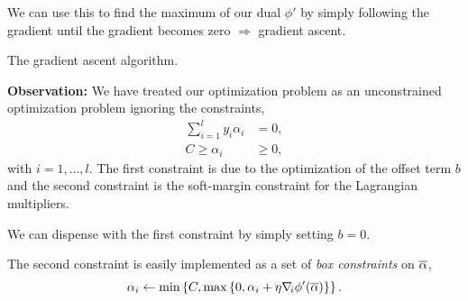 \documentclass[a4paper,blends,pdf,colorBG,slideColor]{prosper}
\begin{document}
We can use this to find the maximum of our dual $\phi'$ by simply following the gradient until the 
gradient becomes zero $\Rightarrow$ gradient ascent.
\es

\vspace{.2in}
\begin{center}
The gradient ascent algorithm.
\end{center}
\es

{\bf Observation:} We have treated our optimization problem as an unconstrained optimization
problem ignoring the constraints,
\begin{align*}
\sum_{i=1}^l y_i \alpha_i &= 0, \\
C \ge \alpha_i &\ge 0,  
\end{align*}
with $i=1,\ldots,l$.
The first constraint is due to the optimization of the offset term $b$ and the second constraint
is the soft-margin constraint for the Lagrangian multipliers.

We can dispense with the first constraint by simply setting $b=0$.

The second constraint is easily implemented as a set of {\em box constraints} on $\overline{\alpha}$,
\begin{equation*}
\alpha_i \leftarrow \min\left\{C,\max\left\{0,\alpha_i + \eta\nabla_{\! i} \phi'(\overline{\alpha})\right\}\right\}.
\end{equation*}

\es
\end{document}
